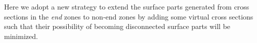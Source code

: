 Here we adopt a new strategy to extend  the surface parts generated
from cross sections in the \textit{end} zones to non-end zones by
adding some virtual cross sections such that their possibility of
becoming disconnected surface parts will be minimized.

\begin{figure} [htbp]
  \centering
\end{figure}
